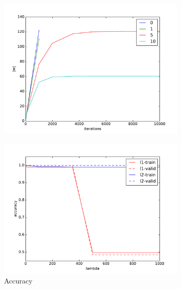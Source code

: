 \documentclass[10pt,psamsfonts]{amsart}
\theoremstyle{definition}
\theoremstyle{remark}
\numberwithin{equation}{section}
\begin{document}
\begin{figure}[b]
	\centering
	\begin{subfigure}[b]{0.23\textwidth}
		\includegraphics[width=\textwidth]{hw2_1-1_1.pdf}
		\caption{}
	\end{subfigure}
	\begin{subfigure}[b]{0.23\textwidth}
		\includegraphics[width=\textwidth]{hw2_1-2_1.pdf}
		\caption{Accuracy}
	\end{subfigure}
	\begin{subfigure}[b]{0.23\textwidth}

\end{subfigure}
\end{figure}
\end{document}
